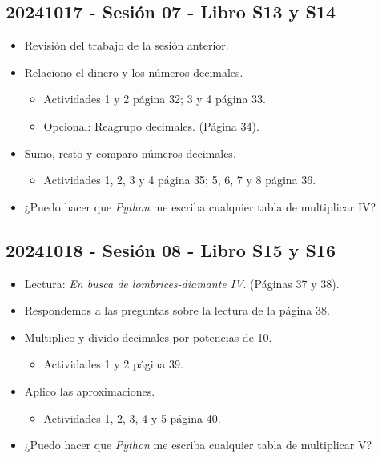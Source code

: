\documentclass[a4paper,12pt]{article}
\begin{document}
\subsection{20241017 - Sesión 07 - Libro S13 y S14}

\begin{itemize}
    \item Revisión del trabajo de la sesión anterior.
    \item Relaciono el dinero y los números decimales.
    \begin{itemize}
        \item Actividades 1 y 2 página 32; 3 y 4 página 33.
        \item Opcional: Reagrupo decimales. (Página 34).
    \end{itemize}
    \item Sumo, resto y comparo números decimales.
    \begin{itemize}
        \item Actividades 1, 2, 3 y 4 página 35; 5, 6, 7 y 8 página 36.
    \end{itemize}
    \item ¿Puedo hacer que \textit{Python} me escriba cualquier tabla de multiplicar IV?
\end{itemize}

\subsection{20241018 - Sesión 08 - Libro S15 y S16}

\begin{itemize}
    \item Lectura: \textit{En busca de lombrices-diamante IV}. (Páginas 37 y 38).
    \item Respondemos a las preguntas sobre la lectura de la página 38.
    \item Multiplico y divido decimales por potencias de 10.
    \begin{itemize}
        \item Actividades 1 y 2 página 39.
    \end{itemize}
    \item Aplico las aproximaciones.
    \begin{itemize}
        \item Actividades 1, 2, 3, 4 y 5 página 40.
    \end{itemize}
    \item ¿Puedo hacer que \textit{Python} me escriba cualquier tabla de multiplicar V?
\end{itemize}
\end{document}
